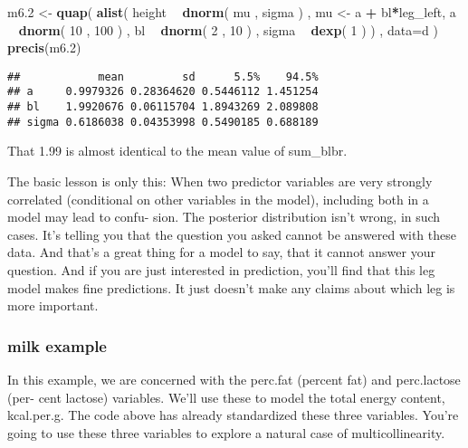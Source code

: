 \documentclass[
]{article}
\newenvironment{Shaded}{\begin{snugshade}}{\end{snugshade}}
\newcommand{\DataTypeTok}[1]{\textcolor[rgb]{0.13,0.29,0.53}{#1}}
\newcommand{\DecValTok}[1]{\textcolor[rgb]{0.00,0.00,0.81}{#1}}
\newcommand{\FloatTok}[1]{\textcolor[rgb]{0.00,0.00,0.81}{#1}}
\newcommand{\KeywordTok}[1]{\textcolor[rgb]{0.13,0.29,0.53}{\textbf{#1}}}
\newcommand{\NormalTok}[1]{#1}
\newcommand{\OperatorTok}[1]{\textcolor[rgb]{0.81,0.36,0.00}{\textbf{#1}}}
\newcommand{\StringTok}[1]{\textcolor[rgb]{0.31,0.60,0.02}{#1}}
\begin{document}
\begin{Shaded}
\begin{Highlighting}[]
\NormalTok{m6}\FloatTok{.2}\NormalTok{ <-}\StringTok{ }\KeywordTok{quap}\NormalTok{( }\KeywordTok{alist}\NormalTok{(}
\NormalTok{height }\OperatorTok{~}\StringTok{ }\KeywordTok{dnorm}\NormalTok{( mu , sigma ) , mu <-}\StringTok{ }\NormalTok{a }\OperatorTok{+}\StringTok{ }\NormalTok{bl}\OperatorTok{*}\NormalTok{leg_left,}
\NormalTok{a }\OperatorTok{~}\StringTok{ }\KeywordTok{dnorm}\NormalTok{( }\DecValTok{10}\NormalTok{ , }\DecValTok{100}\NormalTok{ ) ,}
\NormalTok{bl }\OperatorTok{~}\StringTok{ }\KeywordTok{dnorm}\NormalTok{( }\DecValTok{2}\NormalTok{ , }\DecValTok{10}\NormalTok{ ) ,}
\NormalTok{sigma }\OperatorTok{~}\StringTok{ }\KeywordTok{dexp}\NormalTok{( }\DecValTok{1}\NormalTok{ ) ) , }\DataTypeTok{data=}\NormalTok{d )}
\KeywordTok{precis}\NormalTok{(m6}\FloatTok{.2}\NormalTok{)}
\end{Highlighting}
\end{Shaded}

\begin{verbatim}
##            mean         sd      5.5%    94.5%
## a     0.9979326 0.28364620 0.5446112 1.451254
## bl    1.9920676 0.06115704 1.8943269 2.089808
## sigma 0.6186038 0.04353998 0.5490185 0.688189
\end{verbatim}

That 1.99 is almost identical to the mean value of sum\_blbr.

The basic lesson is only this: When two predictor variables are very
strongly correlated (conditional on other variables in the model),
including both in a model may lead to confu- sion. The posterior
distribution isn't wrong, in such cases. It's telling you that the
question you asked cannot be answered with these data. And that's a
great thing for a model to say, that it cannot answer your question. And
if you are just interested in prediction, you'll find that this leg
model makes fine predictions. It just doesn't make any claims about
which leg is more important.

\hypertarget{milk-example}{%
\subsubsection{milk example}\label{milk-example}}

In this example, we are concerned with the perc.fat (percent fat) and
perc.lactose (per- cent lactose) variables. We'll use these to model the
total energy content, kcal.per.g. The code above has already
standardized these three variables. You're going to use these three
variables to explore a natural case of multicollinearity.
\end{document}
